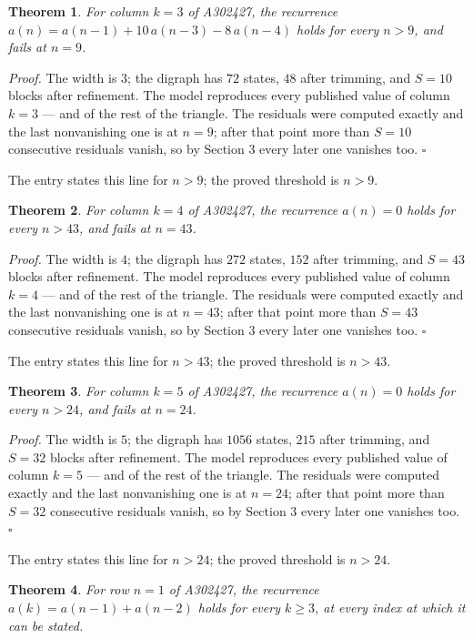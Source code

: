 \documentclass[11pt]{article}
\newtheorem{theorem}{Theorem}
\theoremstyle{definition}
\begin{document}
\begin{theorem} For column $k = 3$ of A302427, the recurrence $a(n) = a(n-1) + 10\,a(n-3) - 8\,a(n-4)$ holds for every $n > 9$, and fails at $n = 9$.\end{theorem}

{\itshape Proof.} The width is $3$; the digraph has $72$ states, $48$ after trimming, and $S = 10$ blocks after refinement. The model reproduces every published value of column $k = 3$ --- and of the rest of the triangle. The residuals were computed exactly and the last nonvanishing one is at $n = 9$; after that point more than $S = 10$ consecutive residuals vanish, so by Section 3 every later one vanishes too. $\square$

The entry states this line for $n > 9$; the proved threshold is $n > 9$.

\begin{theorem} For column $k = 4$ of A302427, the recurrence $a(n) = 0$ holds for every $n > 43$, and fails at $n = 43$.\end{theorem}

{\itshape Proof.} The width is $4$; the digraph has $272$ states, $152$ after trimming, and $S = 43$ blocks after refinement. The model reproduces every published value of column $k = 4$ --- and of the rest of the triangle. The residuals were computed exactly and the last nonvanishing one is at $n = 43$; after that point more than $S = 43$ consecutive residuals vanish, so by Section 3 every later one vanishes too. $\square$

The entry states this line for $n > 43$; the proved threshold is $n > 43$.

\begin{theorem} For column $k = 5$ of A302427, the recurrence $a(n) = 0$ holds for every $n > 24$, and fails at $n = 24$.\end{theorem}

{\itshape Proof.} The width is $5$; the digraph has $1056$ states, $215$ after trimming, and $S = 32$ blocks after refinement. The model reproduces every published value of column $k = 5$ --- and of the rest of the triangle. The residuals were computed exactly and the last nonvanishing one is at $n = 24$; after that point more than $S = 32$ consecutive residuals vanish, so by Section 3 every later one vanishes too. $\square$

The entry states this line for $n > 24$; the proved threshold is $n > 24$.

\begin{theorem} For row $n = 1$ of A302427, the recurrence $a(k) = a(n-1) + a(n-2)$ holds for every $k \ge 3$, at every index at which it can be stated.\end{theorem}
\end{document}
